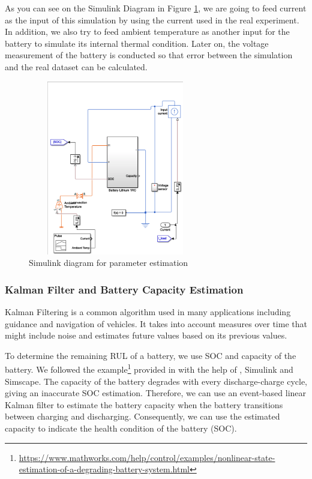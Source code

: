 As you can see on the Simulink Diagram in Figure \ref{fig:simulink_params}, we are going to feed current as the input of this simulation by using the current used in the real experiment. In addition, we also try to feed ambient temperature as another input for the battery to simulate its internal thermal condition. Later on, the voltage measurement of the battery is conducted so that error between the simulation and the real dataset can be calculated.

\begin{figure}
\includegraphics[height=3in, width=3in]{figures/Simulink_params}
\caption{Simulink diagram for parameter estimation}
\label{fig:simulink_params}
\end{figure}

\subsubsection{Kalman Filter and Battery Capacity Estimation}

Kalman Filtering is a common algorithm used in many applications including guidance and navigation of vehicles. It takes into account measures over time that might include noise and estimates future values based on its previous values.

To determine the remaining RUL of a battery, we use SOC and capacity of the battery. We followed the example\footnote{\url{https://www.mathworks.com/help/control/examples/nonlinear-state-estimation-of-a-degrading-battery-system.html}} provided in \cite{6183271} with the help of \MATLAB, Simulink and Simscape. The capacity of the battery degrades with every discharge-charge cycle, giving an inaccurate SOC estimation. Therefore, we can use an event-based linear Kalman filter to estimate the battery capacity when the battery transitions between charging and discharging. Consequently, we can use the estimated capacity to indicate the health condition of the battery (SOC).

